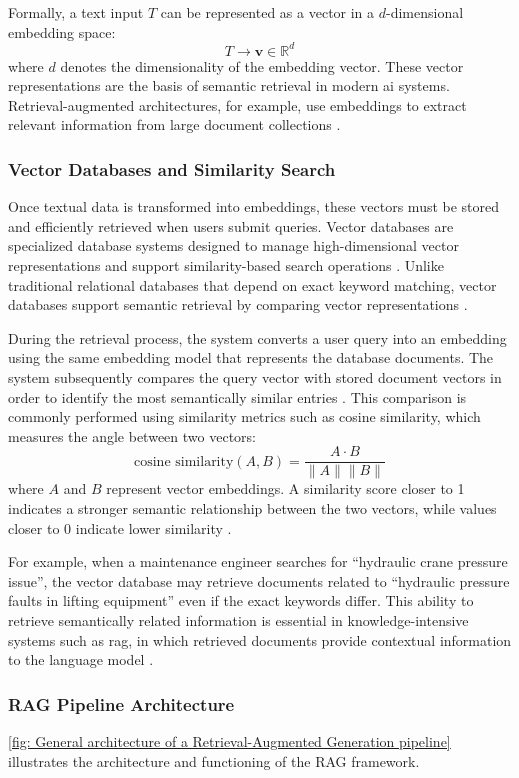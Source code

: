 Formally, a text input $T$ can be represented as a vector in a $d$-dimensional embedding space:
\[
T \rightarrow \mathbf{v} \in \mathbb{R}^{d}
\]
where $d$ denotes the dimensionality of the embedding vector. These vector representations are the basis of semantic retrieval in modern \acrshort{ai} systems. Retrieval-augmented architectures, for example, use embeddings to extract relevant information from large document collections \cite{chen_application_2025}.

\subsubsection{Vector Databases and Similarity Search\label{sec:Vector Databases and Similarity Search}}
Once textual data is transformed into embeddings, these vectors must be stored and efficiently retrieved when users submit queries. Vector databases are specialized database systems designed to manage high-dimensional vector representations and support similarity-based search operations \cite{Holvoet2025RAG} . Unlike traditional relational databases that depend on exact keyword matching, vector databases support semantic retrieval by comparing vector representations \cite{Rusum2024VectorDB}.

During the retrieval process, the system converts a user query into an embedding using the same embedding model that represents the database documents. The system subsequently compares the query vector with stored document vectors in order to identify the most semantically similar entries \cite{chen_application_2025}. This comparison is commonly performed using similarity metrics such as cosine similarity, which measures the angle between two vectors:
\[
\text{cosine similarity}(A,B) = \frac{A \cdot B}{\|A\|\|B\|}
\]
where $A$ and $B$ represent vector embeddings. A similarity score closer to 1 indicates a stronger semantic relationship between the two vectors, while values closer to 0 indicate lower similarity \cite{Rusum2024VectorDB}.

For example, when a maintenance engineer searches for “hydraulic crane pressure issue”, the vector database may retrieve documents related to “hydraulic pressure faults in lifting equipment” even if the exact keywords differ. This ability to retrieve semantically related information is essential in knowledge-intensive systems such as \acrfull{rag}, in which retrieved documents provide contextual information to the language model \cite{chen_application_2025} \cite{Holvoet2025RAG}.
\subsubsection{RAG Pipeline Architecture\label{sec:RAG Pipeline Architecture}}
\autoref{fig: General architecture of a Retrieval-Augmented Generation pipeline} illustrates the architecture and functioning of the RAG framework.

